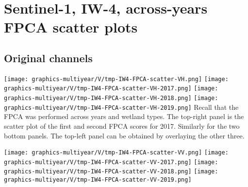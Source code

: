 
\section{Sentinel-1, IW-4, across-years FPCA scatter plots}
\setcounter{theorem}{0}

\renewcommand{\theenumi}{\roman{enumi}}
\renewcommand{\labelenumi}{\textnormal{(\theenumi)}$\;\;$}


\subsection{Original channels}
\label{FPCA-scatter-original-IW4}

\begin{center}
\begin{minipage}{7.0in}
\texttt{[image: graphics-multiyear/V/tmp-IW4-FPCA-scatter-VH.png]}
\quad
\texttt{[image: graphics-multiyear/V/tmp-IW4-FPCA-scatter-VH-2017.png]}
\vskip 1.0cm
\texttt{[image: graphics-multiyear/V/tmp-IW4-FPCA-scatter-VH-2018.png]}
\quad
\texttt{[image: graphics-multiyear/V/tmp-IW4-FPCA-scatter-VH-2019.png]}
\vskip 1.0cm
Recall that the FPCA was performed across years and wetland types.
The top-right panel is the scatter plot of the first and second FPCA scores
for 2017.
Similarly for the two bottom panels.
The top-left panel can be obtained by overlaying the other three.
\end{minipage}
\end{center}


\clearpage
\begin{center}
\begin{minipage}{7.0in}
\texttt{[image: graphics-multiyear/V/tmp-IW4-FPCA-scatter-VV.png]}
\quad
\texttt{[image: graphics-multiyear/V/tmp-IW4-FPCA-scatter-VV-2017.png]}
\vskip 1.0cm
\texttt{[image: graphics-multiyear/V/tmp-IW4-FPCA-scatter-VV-2018.png]}
\quad
\texttt{[image: graphics-multiyear/V/tmp-IW4-FPCA-scatter-VV-2019.png]}
\end{minipage}
\end{center}


